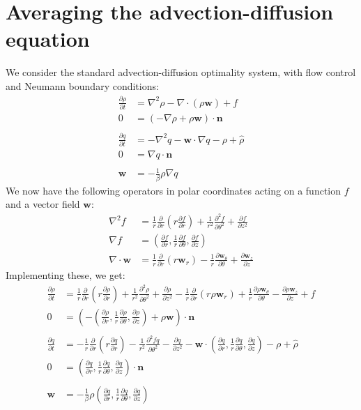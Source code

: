 \documentclass[11pt, a4paper]{article}
\theoremstyle{definition}
\newcommand{\w}{\mathbf{w}}
\newcommand{\n}{\mathbf{n}}
\newcommand{\hr}{\widehat \rho}
\begin{document}
	
	
\section{Averaging the advection-diffusion equation}
We consider the standard advection-diffusion optimality system, with flow control and Neumann boundary conditions:
\begin{align*}
	\frac{\partial \rho}{\partial t} &= \nabla^2 \rho - \nabla \cdot (\rho \w) + f\\
	0 &= (- \nabla \rho + \rho \w) \cdot \n \\
	\\
	\frac{\partial q}{\partial t} &= - \nabla^2 q - \w \cdot \nabla q - \rho + \hr\\
	0 &= \nabla q \cdot \n \\
	\\
	\w &= - \frac{1}{\beta}\rho \nabla q
\end{align*}
We now have the following operators in polar coordinates acting on a function $f$ and a vector field $\w$:
\begin{align*}
	\nabla^2 f &= \frac{1}{r} \frac{\partial}{\partial r} \left( r \frac{\partial f}{\partial r}\right) + \frac{1}{r^2} \frac{\partial^2 f}{\partial \theta^2} + \frac{\partial f}{\partial z^2}\\
	\nabla f &= \left(\frac{\partial f}{\partial r}, \frac{1}{r}\frac{\partial f}{\partial \theta}, \frac{\partial f}{\partial z}\right)\\
	\nabla \cdot \w &= \frac{1}{r}\frac{\partial }{\partial r}\left(r \w_r\right) - \frac{1}{r}\frac{\partial \w_\theta}{\partial \theta} + \frac{\partial \w_z}{\partial z}
\end{align*}
Implementing these, we get:
\begin{align*}
	\frac{\partial \rho}{\partial t} &= \frac{1}{r} \frac{\partial}{\partial r} \left( r \frac{\partial \rho}{\partial r}\right) + \frac{1}{r^2} \frac{\partial^2 \rho}{\partial \theta^2} + \frac{\partial \rho}{\partial z^2} - \frac{1}{r}\frac{\partial }{\partial r}\left(r \rho\w_r\right) + \frac{1}{r}\frac{\partial \rho\w_\theta}{\partial \theta} - \frac{\partial \rho\w_z}{\partial z} + f\\
	0 &= \left(- \left(\frac{\partial \rho}{\partial r}, \frac{1}{r}\frac{\partial \rho}{\partial \theta}, \frac{\partial \rho}{\partial z}\right) + \rho \w \right) \cdot \n \\
	\\
	\frac{\partial q}{\partial t} &= -  \frac{1}{r} \frac{\partial}{\partial r} \left( r \frac{\partial q}{\partial r}\right) - \frac{1}{r^2} \frac{\partial^2 fq}{\partial \theta^2} - \frac{\partial q}{\partial z^2} - \w \cdot \left(\frac{\partial q}{\partial r}, \frac{1}{r}\frac{\partial q}{\partial \theta}, \frac{\partial q}{\partial z}\right) - \rho + \hr\\
	0 &= \left(\frac{\partial q}{\partial r}, \frac{1}{r}\frac{\partial q}{\partial \theta}, \frac{\partial q}{\partial z}\right) \cdot \n \\
	\\
	\w &= - \frac{1}{\beta}\rho  \left(\frac{\partial q}{\partial r}, \frac{1}{r}\frac{\partial q}{\partial \theta}, \frac{\partial q}{\partial z}\right)
\end{align*}
\end{document}
